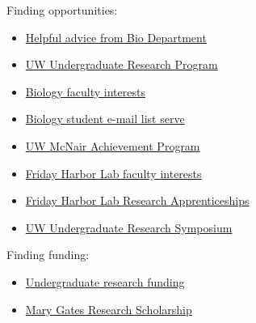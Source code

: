 \begin{frame}
    \footnotesize
    \begin{adjustwidth}{0em}{0em}
        \vspace{-1mm}
        Finding opportunities:
        \begin{itemize}
            \item \href{http://www.biology.washington.edu/research/undergraduate}{Helpful advice from Bio Department}
            \item \href{http://www.washington.edu/undergradresearch/students/find/}{UW Undergraduate Research Program}
            \item \href{http://www.biology.washington.edu/research}{Biology faculty interests}
            \item \href{http://mailman12.u.washington.edu/mailman/listinfo/biostudent}{Biology student e-mail list serve}
            \item \href{http://depts.washington.edu/uwmcnair/}{UW McNair Achievement Program}
            \item \href{http://depts.washington.edu/fhl/ResInts2013.html}{Friday Harbor Lab faculty interests}
            \item \href{http://depts.washington.edu/fhl/stu_index.html}{Friday Harbor Lab Research Apprenticeships}
            \item \href{http://www.washington.edu/undergradresearch/symposium/}{UW Undergraduate Research Symposium}
        \end{itemize}

        Finding funding:
        \begin{itemize}
            \item \href{http://www.washington.edu/undergradresearch/students/funding/}{Undergraduate research funding}
            \item \href{http://expd.washington.edu/mge/apply/research/index.htm}{Mary Gates Research Scholarship}
        \end{itemize}


\end{adjustwidth}
\end{frame}
